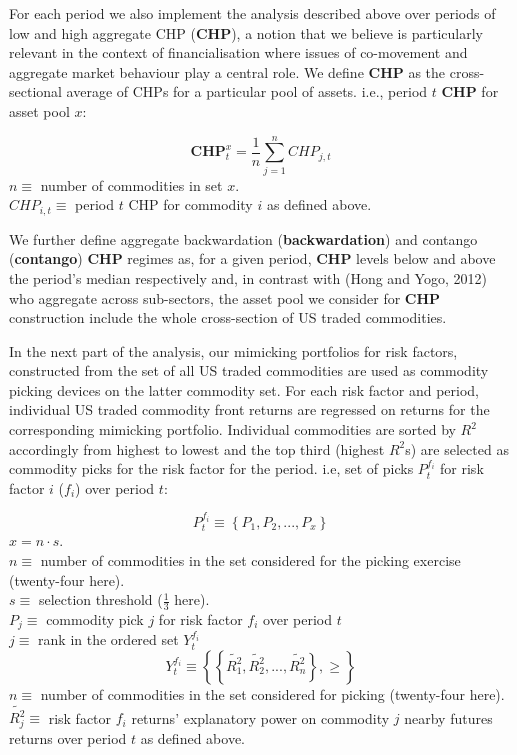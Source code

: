 \documentclass[]{elsarticle} %
\begin{document}
\medskip\setlength{\parindent}{0pt}

For each period we also implement the analysis described above over periods of low and high aggregate CHP (\textbf{CHP}), a notion that we believe is particularly relevant in the context of financialisation where issues of co-movement and aggregate market behaviour play a central role. We define \textbf{CHP} as the cross-sectional average of CHPs for a particular pool of assets. i.e., period \(t\) \textbf{CHP} for asset pool \(x\):

\[\mathbf{CHP}_{t}^{x}=\frac{1}{n}\sum_{j=1}^{n}CHP_{j,t}\]
\(n\equiv\) number of commodities in set \(x\).\\
\(CHP_{i,t}\equiv\) period \(t\) CHP for commodity \(i\) as defined above.

\medskip\setlength{\parindent}{0pt}

We further define aggregate backwardation (\textbf{backwardation}) and contango (\textbf{contango}) \textbf{CHP} regimes as, for a given period, \textbf{CHP} levels below and above the period's median respectively and, in contrast with (Hong and Yogo, 2012) who aggregate across sub-sectors, the asset pool we consider for \textbf{CHP} construction include the whole cross-section of US traded commodities.

\medskip\setlength{\parindent}{0pt}

In the next part of the analysis, our mimicking portfolios for risk factors, constructed from the set of all US traded commodities are used as commodity picking devices on the latter commodity set. For each risk factor and period, individual US traded commodity front returns are regressed on returns for the corresponding mimicking portfolio. Individual commodities are sorted by \(R^{2}\) accordingly from highest to lowest and the top third (highest \(R^{2}\)s) are selected as commodity picks for the risk factor for the period. i.e, set of picks \(P_{t}^{f_{i}}\) for risk factor \(i\) (\(f_{i}\)) over period \(t\):

\[P_{t}^{f_{i}}\equiv\left \{ P_{1}, P_{2}, ..., P_{x} \right \}\]
\(x = n \cdot s\).\\
\(n\equiv\) number of commodities in the set considered for the picking exercise (twenty-four here).\\
\(s\equiv\) selection threshold (\(\frac{1}{3}\) here).\\
\(P_{j}\equiv\) commodity pick \(j\) for risk factor \(f_{i}\) over period \(t\)\\
\(j\equiv\) rank in the ordered set \(Y_{t}^{f_{i}}\)\\
\[Y_{t}^{f_{i}}\equiv\left \{ \left \{ \tilde{R_{1}^{2}}, \tilde{R_{2}^{2}}, ..., \tilde{R_{n}^{2}} \right \}, \geq \right \}\]
\(n\equiv\) number of commodities in the set considered for picking (twenty-four here).\\
\(\tilde{R_{j}^{2}}\equiv\) risk factor \(f_{i}\) returns' explanatory power on commodity \(j\) nearby futures returns over period \(t\) as defined above.
\end{document}
